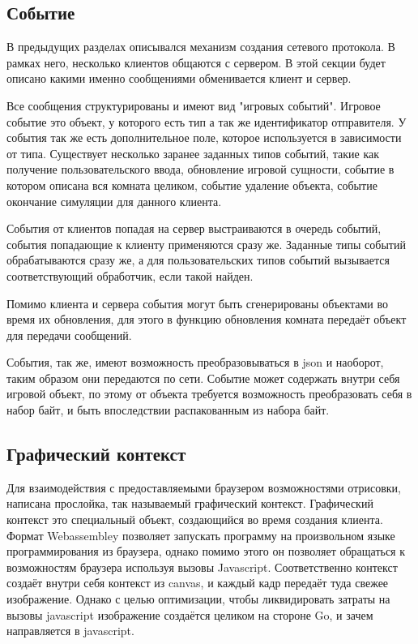 \documentclass[a4paper,14pt, openany]{book}
\begin{document}
\subsection{Событие}

В предыдущих разделах описывался механизм создания сетевого протокола. В рамках него, несколько клиентов общаются с сервером. В этой секции будет описано какими именно сообщениями обменивается клиент и сервер.

Все сообщения структурированы и имеют вид "игровых событий". Игровое событие это объект, у которого есть тип а так же идентификатор отправителя. У события так же есть дополнительное поле, которое используется в зависимости от типа. Существует несколько заранее заданных типов событий, такие как получение пользовательского ввода, обновление игровой сущности, событие в котором описана вся комната целиком, событие удаление объекта, событие окончание симуляции для данного клиента.

События от клиентов попадая на сервер выстраиваются в очередь событий, события попадающие к клиенту применяются сразу же. Заданные типы событий обрабатываются сразу же, а для пользовательских типов событий вызывается соответствующий обработчик, если такой найден. 

Помимо клиента и сервера события могут быть сгенерированы объектами во время их обновления, для этого в функцию обновления комната передаёт объект для передачи сообщений.

События, так же, имеют возможность преобразовываться в json и наоборот, таким образом они передаются по сети. Событие может содержать внутри себя игровой объект, по этому от объекта требуется возможность преобразовать себя в набор байт, и быть впоследствии распакованным из набора байт.

\subsection{Графический контекст}

Для взаимодействия с предоставляемыми браузером возможностями отрисовки, написана прослойка, так называемый графический контекст. Графический контекст это специальный объект, создающийся во время создания клиента. Формат Webassembley позволяет запускать программу на произвольном языке программирования из браузера, однако помимо этого он позволяет обращаться к возможностям браузера используя вызовы Javascript. Соответственно контекст создаёт внутри себя контекст из canvas, и каждый кадр передаёт туда свежее изображение. Однако с целью оптимизации, чтобы ликвидировать затраты на вызовы javascript изображение создаётся целиком на стороне Go, и зачем направляется в javascript. 
\end{document}
